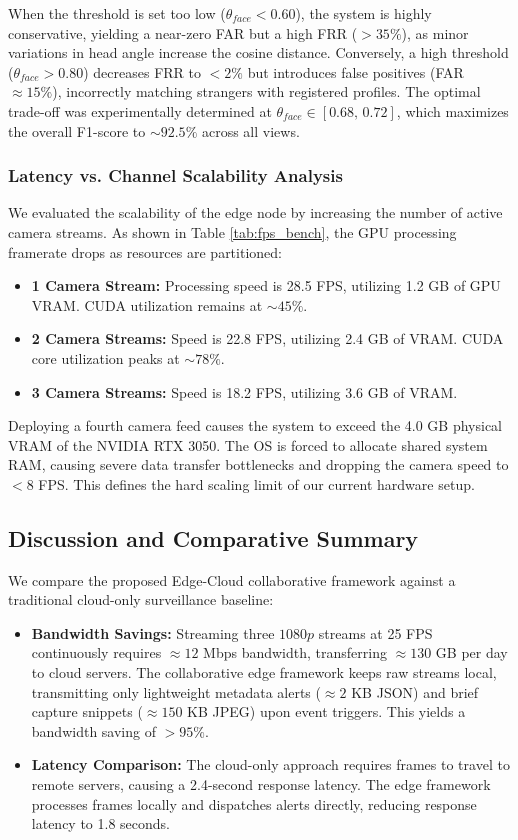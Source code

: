 \documentclass[12pt,a4paper]{article}
\begin{document}
When the threshold is set too low ($\theta_{face} < 0.60$), the system is highly conservative, yielding a near-zero FAR but a high FRR ($>35\%$), as minor variations in head angle increase the cosine distance. Conversely, a high threshold ($\theta_{face} > 0.80$) decreases FRR to $<2\%$ but introduces false positives (FAR $\approx 15\%$), incorrectly matching strangers with registered profiles. The optimal trade-off was experimentally determined at $\theta_{face} \in [0.68,\, 0.72]$, which maximizes the overall F1-score to $\sim 92.5\%$ across all views.

\subsubsection{Latency vs. Channel Scalability Analysis}
We evaluated the scalability of the edge node by increasing the number of active camera streams. As shown in Table \ref{tab:fps_bench}, the GPU processing framerate drops as resources are partitioned:
\begin{itemize}
    \item \textbf{1 Camera Stream:} Processing speed is 28.5 FPS, utilizing 1.2 GB of GPU VRAM. CUDA utilization remains at $\sim 45\%$.
    \item \textbf{2 Camera Streams:} Speed is 22.8 FPS, utilizing 2.4 GB of VRAM. CUDA core utilization peaks at $\sim 78\%$.
    \item \textbf{3 Camera Streams:} Speed is 18.2 FPS, utilizing 3.6 GB of VRAM.
\end{itemize}
Deploying a fourth camera feed causes the system to exceed the 4.0 GB physical VRAM of the NVIDIA RTX 3050. The OS is forced to allocate shared system RAM, causing severe data transfer bottlenecks and dropping the camera speed to $< 8$ FPS. This defines the hard scaling limit of our current hardware setup.

\subsection{Discussion and Comparative Summary}
We compare the proposed Edge-Cloud collaborative framework against a traditional cloud-only surveillance baseline:
\begin{itemize}
    \item \textbf{Bandwidth Savings:} Streaming three $1080p$ streams at 25 FPS continuously requires $\approx 12$ Mbps bandwidth, transferring $\approx 130$ GB per day to cloud servers. The collaborative edge framework keeps raw streams local, transmitting only lightweight metadata alerts ($\approx 2$ KB JSON) and brief capture snippets ($\approx 150$ KB JPEG) upon event triggers. This yields a bandwidth saving of $> 95\%$.
    \item \textbf{Latency Comparison:} The cloud-only approach requires frames to travel to remote servers, causing a 2.4-second response latency. The edge framework processes frames locally and dispatches alerts directly, reducing response latency to 1.8 seconds.
\end{itemize}
\end{document}

